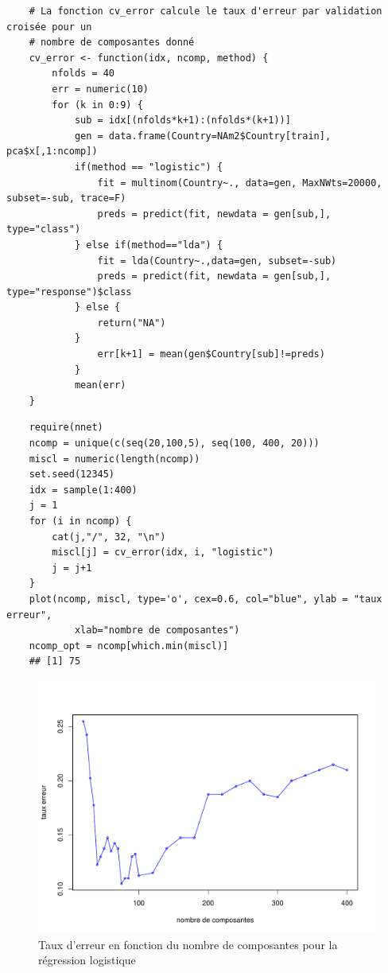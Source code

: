 \documentclass[12pt,a4paper]{article}
\begin{document}
\begin{lstlisting}
	# La fonction cv_error calcule le taux d'erreur par validation croisée pour un 
	# nombre de composantes donné
	cv_error <- function(idx, ncomp, method) {
		nfolds = 40
		err = numeric(10)
		for (k in 0:9) {
			sub = idx[(nfolds*k+1):(nfolds*(k+1))]
			gen = data.frame(Country=NAm2$Country[train], pca$x[,1:ncomp])
			if(method == "logistic") {
				fit = multinom(Country~., data=gen, MaxNWts=20000, subset=-sub, trace=F)
				preds = predict(fit, newdata = gen[sub,], type="class")
			} else if(method=="lda") {
				fit = lda(Country~.,data=gen, subset=-sub)
				preds = predict(fit, newdata = gen[sub,], type="response")$class
			} else {
				return("NA")
			}
				err[k+1] = mean(gen$Country[sub]!=preds)
			}
			mean(err)
	}
\end{lstlisting}
\begin{lstlisting}
	require(nnet)
	ncomp = unique(c(seq(20,100,5), seq(100, 400, 20)))
	miscl = numeric(length(ncomp))
	set.seed(12345)
	idx = sample(1:400)
	j = 1
	for (i in ncomp) {
		cat(j,"/", 32, "\n")
		miscl[j] = cv_error(idx, i, "logistic")
		j = j+1
	}
	plot(ncomp, miscl, type='o', cex=0.6, col="blue", ylab = "taux erreur",
			xlab="nombre de composantes")
	ncomp_opt = ncomp[which.min(miscl)]
	## [1] 75
\end{lstlisting}
\begin{figure}[h!]
	\begin{center}
		\includegraphics[scale=0.5]{figures/nopt_log.pdf}
		\caption{Taux d'erreur en fonction du nombre de composantes pour la régression logistique}
		\label{fig:nopt_log}
	\end{center}
\end{figure}
\end{document}
